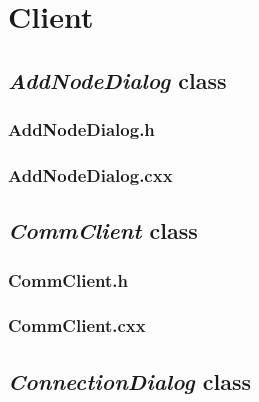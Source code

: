 \chapter{Client}

\section{\textit{AddNodeDialog} class}

\subsection{AddNodeDialog.h}


\newpage

\subsection{AddNodeDialog.cxx}


\newpage


\section{\textit{CommClient} class}

\subsection{CommClient.h}


\newpage

\subsection{CommClient.cxx}


\newpage


\section{\textit{ConnectionDialog} class}

